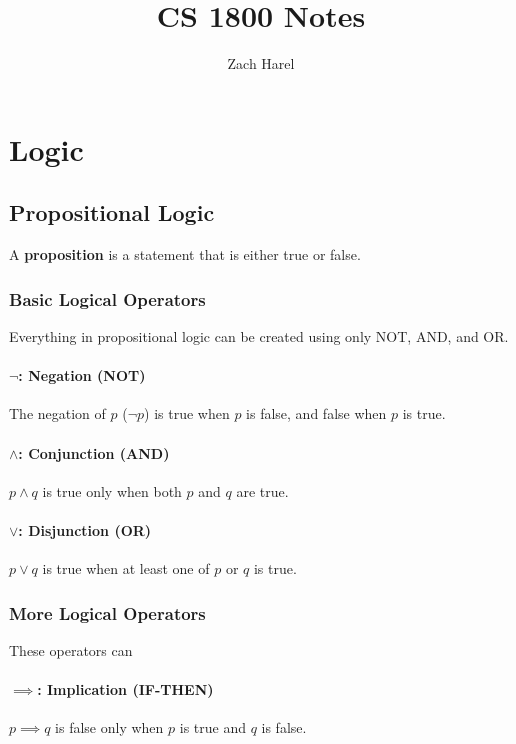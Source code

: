 \documentclass{report}
\title{CS 1800 Notes}
\author{Zach Harel}
\begin{document}
\maketitle

\chapter{Logic}

\section{Propositional Logic}

A \textbf{proposition} is a statement that is either true or false.

\subsection{Basic Logical Operators}

Everything in propositional logic can be created using only NOT, AND, and OR.

\subsubsection{$\neg$: Negation (NOT)}
The negation of $p$ ($\neg p$) is true when $p$ is false, and false when $p$ is true.

\subsubsection{$\land$: Conjunction (AND)}
$p \land q$ is true only when both $p$ and $q$ are true.

\subsubsection{$\lor$: Disjunction (OR)}
$p \lor q$ is true when at least one of $p$ or $q$ is true.

\subsection{More Logical Operators}

These operators can 

\subsubsection{$\implies$: Implication (IF-THEN)}
$p \implies q$ is false only when $p$ is true and $q$ is false.
\end{document}
